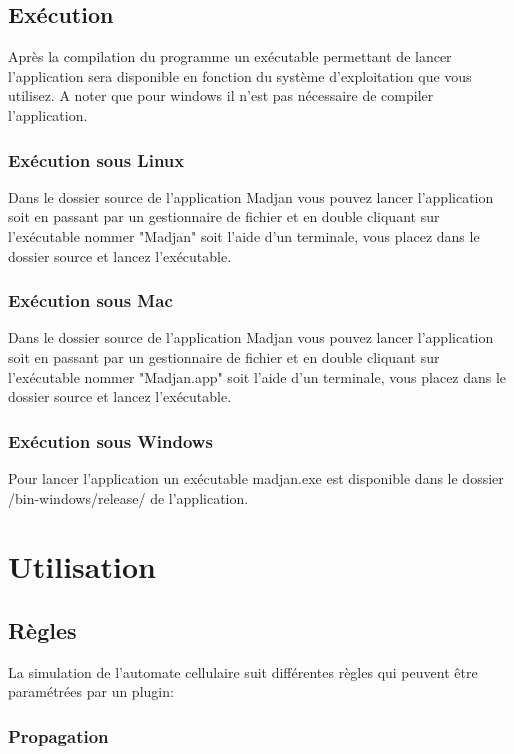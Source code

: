 \documentclass[pdftex,12pt,a4paper]{article}
\begin{document}
	\subsection{Exécution}
    Après la compilation du programme un exécutable permettant de lancer l'application sera disponible en fonction du système d'exploitation que vous utilisez. A noter que pour windows il n'est pas nécessaire de compiler l'application.
    
         \subsubsection{Exécution sous Linux}
          Dans le dossier source de l'application Madjan vous pouvez lancer l'application soit en passant par un gestionnaire de fichier et en double cliquant sur l'exécutable nommer "Madjan"  soit  l'aide d'un terminale, vous placez dans le dossier source et lancez l'exécutable. 
          
         \subsubsection{Exécution sous Mac}
    	 	Dans le dossier source de l'application Madjan vous pouvez lancer l'application soit en passant par un gestionnaire de fichier et en double cliquant sur l'exécutable nommer "Madjan.app"  soit  l'aide d'un terminale, vous placez dans le dossier source et lancez l'exécutable.
            
    	\subsubsection{Exécution sous Windows}\label{execWind}
       Pour lancer l'application un exécutable madjan.exe est disponible dans le dossier /bin-windows/release/ de l'application.
  
    \newpage
  \section{Utilisation}
  	
    
    \subsection{Règles}
     
    La simulation de l'automate cellulaire suit différentes règles qui peuvent être paramétrées par un plugin:
    
     \subsubsection{Propagation}\label{prop}
     
\end{document}

